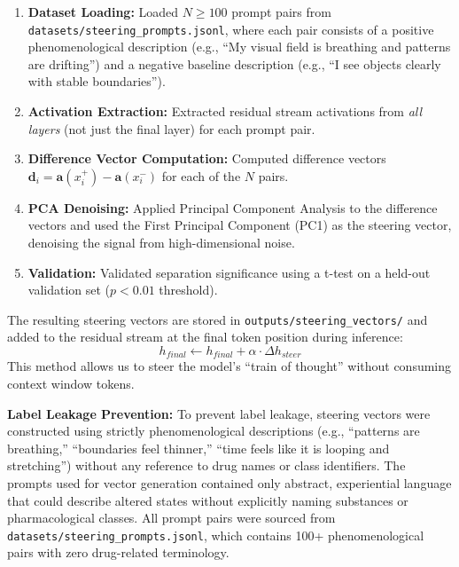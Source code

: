\documentclass[10pt]{article}
\begin{document}
\begin{enumerate}
    \item \textbf{Dataset Loading:} Loaded $N \geq 100$ prompt pairs from \texttt{datasets/steering\_prompts.jsonl}, where each pair consists of a positive phenomenological description (e.g., ``My visual field is breathing and patterns are drifting'') and a negative baseline description (e.g., ``I see objects clearly with stable boundaries'').
    \item \textbf{Activation Extraction:} Extracted residual stream activations from \textit{all layers} (not just the final layer) for each prompt pair.
    \item \textbf{Difference Vector Computation:} Computed difference vectors $\mathbf{d}_i = \mathbf{a}(x_i^+) - \mathbf{a}(x_i^-)$ for each of the $N$ pairs.
    \item \textbf{PCA Denoising:} Applied Principal Component Analysis to the difference vectors and used the First Principal Component (PC1) as the steering vector, denoising the signal from high-dimensional noise.
    \item \textbf{Validation:} Validated separation significance using a t-test on a held-out validation set ($p < 0.01$ threshold).
\end{enumerate}

The resulting steering vectors are stored in \texttt{outputs/steering\_vectors/} and added to the residual stream at the final token position during inference:
\begin{equation}
    h_{final} \leftarrow h_{final} + \alpha \cdot \Delta h_{steer}
\end{equation}
This method allows us to steer the model's ``train of thought'' without consuming context window tokens.

\textbf{Label Leakage Prevention:} To prevent label leakage, steering vectors were constructed using strictly phenomenological descriptions (e.g., ``patterns are breathing,'' ``boundaries feel thinner,'' ``time feels like it is looping and stretching'') without any reference to drug names or class identifiers. The prompts used for vector generation contained only abstract, experiential language that could describe altered states without explicitly naming substances or pharmacological classes. All prompt pairs were sourced from \texttt{datasets/steering\_prompts.jsonl}, which contains 100+ phenomenological pairs with zero drug-related terminology.
\end{document}
